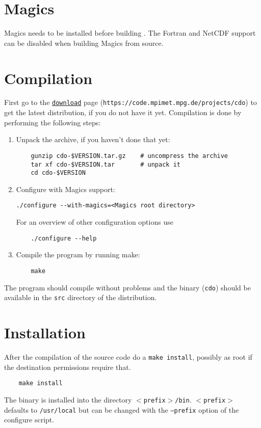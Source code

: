 \section{Magics}
 
Magics needs to be installed before building {\CDO}.
The Fortran and NetCDF support can be disabled when building Magics from source.

\section{Compilation}

First go to the {\CDO}  \href{https://code.mpimet.mpg.de/projects/cdo}{\texttt{download}} page
(\texttt{https://code.mpimet.mpg.de/projects/cdo}) to get the latest distribution,
if you do not have it yet.
Compilation is done by performing the following steps:

\begin{enumerate}
\item Unpack the archive, if you haven't done that yet:
   
\begin{verbatim}
    gunzip cdo-$VERSION.tar.gz    # uncompress the archive
    tar xf cdo-$VERSION.tar       # unpack it
    cd cdo-$VERSION
\end{verbatim}

\item Configure {\CDO} with Magics support:
 
\begin{verbatim}
./configure --with-magics=<Magics root directory>
\end{verbatim}

For an overview of other configuration options use

\begin{verbatim}
    ./configure --help
\end{verbatim}

\item Compile the program by running make:

\begin{verbatim}
    make
\end{verbatim}

\end{enumerate}

The program should compile without problems and the binary (\texttt{cdo}) 
should be available in the \texttt{src} directory of the distribution.


\section{Installation}

After the compilation of the source code do a \texttt{make install},
possibly as root if the destination permissions require that.

\begin{verbatim}
    make install
\end{verbatim} 

The binary is installed into the directory \texttt{$<$prefix$>$/bin}.
\texttt{$<$prefix$>$} defaults to \texttt{/usr/local} but can be changed with 
the \texttt{--prefix} option of the configure script. 
